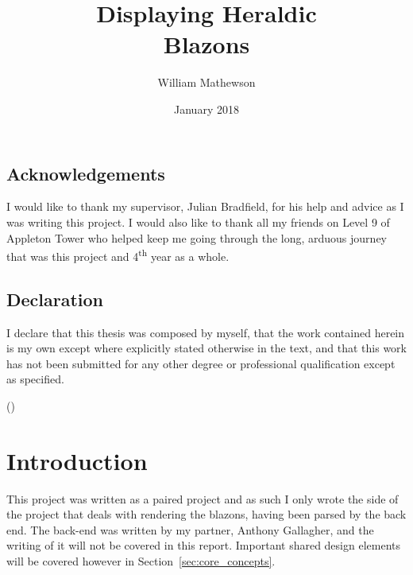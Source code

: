 \documentclass[nobib, a4paper, twoside, justified]{tufte-book}
\title{Displaying Heraldic\\Blazons}
\author{William Mathewson}
\date{January 2018}
\makeatletter
\newcommand{\blazons}{\glspl{blazon}\@\xspace}
\makeatother
\begin{document}
\frontmatter

\maketitlepage{}


\begin{publicationmeta}
  \section*{Acknowledgements}
  I would like to thank my supervisor, Julian Bradfield, for his help and advice as I was writing
  this project. I would also like to thank all my friends on Level 9 of Appleton Tower who helped
  keep me going through the long, arduous journey that was this project and 4\textsuperscript{th}
  year as a whole.

  \section*{Declaration}
  I declare that this thesis was composed by myself,
  that the work contained herein is my own
  except where explicitly stated otherwise in the text,
  and that this work has not been submitted for any other degree or
  professional qualification except as specified.\par
  ({\textit{\thanklessauthor}})
\end{publicationmeta}

\tableofcontents


\mainmatter{}

\chapter{Introduction}\label{cha:introduction}

This project was written as a paired project and as such I only wrote the side of the project that
deals with rendering the \blazons{}, having been parsed by the back end. The back-end was
written by my partner, Anthony Gallagher, and the writing of it will not be covered in this report.
Important shared design elements will be covered however in Section~\ref{sec:core_concepts}.
\end{document}
